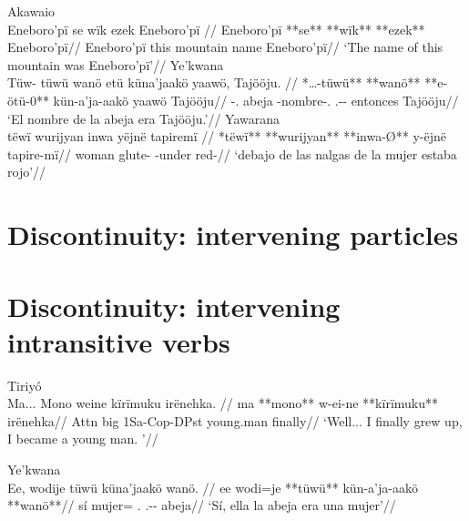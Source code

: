 \documentclass[10pt]{article}
\begin{document}
\pex\label{}    \a Akawaio\\
    \label{ra-eagle-story-034}        \begingl
        \glpreamble Eneboro'pï se wïk ezek Eneboro'pï //
        \gla Eneboro'pï **se** **wïk** **ezek** Eneboro'pï//
        \glb Eneboro'pï this mountain name Eneboro'pï//
            \glft ‘The name of this mountain was Eneboro'pï’//  
        \endgl 
    \a Ye'kwana\\
    \label{ctoabjpic-027}        \begingl
        \glpreamble Tüw- tüwü wanö etü küna'jaakö yaawö, Tajööju. //
        \gla **…-tüwü** **wanö** **e-ötü-0** kün-a'ja-aakö yaawö Tajööju//
        \glb {}-. abeja -nombre-. .-- entonces Tajööju//
            \glft ‘El nombre de la abeja era Tajööju.’//  
        \endgl 
    \a Yawarana\\
    \label{ctorosq-66}        \begingl
        \glpreamble tëwï wurijyan inwa yëjnë tapiremï //
        \gla **tëwï** **wurijyan** **inwa-Ø** y-ëjnë tapire-mï//
        \glb {} woman glute- -under red-//
            \glft ‘debajo de las nalgas de la mujer estaba rojo’//  
        \endgl 
\xe

\section{Discontinuity: intervening particles}


\section{Discontinuity: intervening intransitive verbs}

\ex Tiriyó \parencite{meiraDBtrio} \\
\label{data-01-yakari-01-p-127-022}    \begingl
    \glpreamble Ma... Mono weine kïrïmuku irënehka. //
    \gla ma **mono** w-ei-ne **kïrïmuku** irënehka//
    \glb Attn big 1Sa-Cop-DPst young.man finally//
        \glft ‘Well... I finally grew up, I became a young man.  ’//  
    \endgl 
\xe

\ex Ye'kwana \parencite{caceresDByekwana} \\
\label{ctoabjpic-094}    \begingl
    \glpreamble Ee, wodije tüwü küna'jaakö wanö. //
    \gla ee wodi=je **tüwü** kün-a'ja-aakö **wanö**//
    \glb sí mujer= . .-- abeja//
        \glft ‘Sí, ella la abeja era una mujer’//  
    \endgl 
\xe
\end{document}
